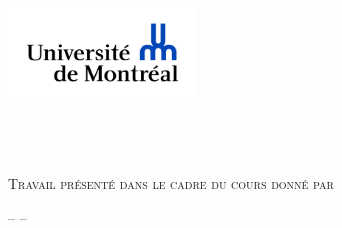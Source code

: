 \documentclass[12pt,french,letterpaper]{article}
\date{}
\begin{document}

\begin{titlepage}%
\begin{center}
    \enlargethispage{2cm}
    
\includegraphics[width = 50mm]{logo} %

\vspace*{3cm}
\scshape\Huge \\
\normalfont\Large \\
\large \\
\normalsize\vspace*{1cm}Travail présenté dans le cadre du cours  \normalfont donné par 

\vspace*{3cm}
\end{center}

\vspace*{\fill}
\begin{flushright}
\end{flushright}

\begin{center}
\scshape\normalsize\vspace*{1cm} -- -- \\
\end{center}
\end{titlepage}




\newpage 

\normalsize{}
\end{document}
